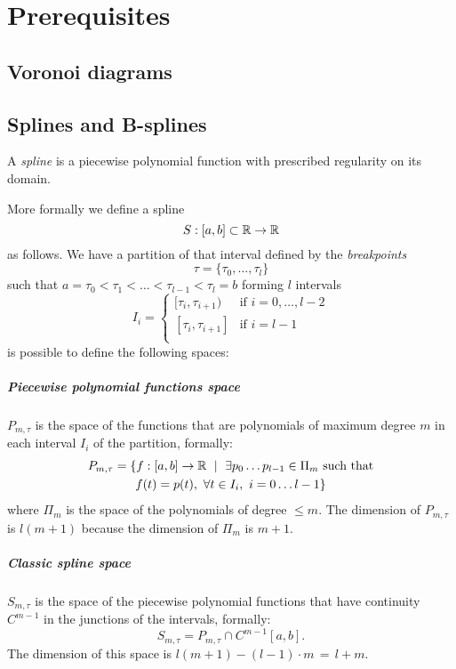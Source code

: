 \documentclass[dissertation.tex]{subfiles}
\begin{document}
\chapter{Prerequisites}
\section{Voronoi diagrams}\label{sec:voronoi}
\section{Splines and B-splines}\label{sec:spline}
A \emph{spline} is a piecewise polynomial function with prescribed
regularity on its domain.

More formally we define a spline
$$S:[a,b]\subset\mathbb{R}\rightarrow\mathbb{R}$$
as follows.
We have a partition of that interval defined by the \emph{breakpoints}
$$\tau = \{\tau_0,\dots,\tau_l\}$$
such that $a=\tau_0<\tau_1<\dots<\tau_{l-1}<\tau_l=b$ forming $l$
intervals
$$
I_i=
\begin{cases}
  [\tau_i,\tau_{i+1}) & \mbox{if } i=0,\dots,l-2\\
    [\tau_i,\tau_{i+1}] & \mbox{if } i=l-1\\
\end{cases}
$$
is possible to define the following spaces:
\paragraph{Piecewise polynomial functions space} $P_{m,\tau}$
is the space of the functions that are polynomials of maximum degree $m$
in each interval $I_i$ of the partition, formally:
\begin{multline*}
  P_{m,\tau}=\{f:[a,b]\rightarrow\mathbb{R}\ \mid\ \exists p_0\dots
  p_{l-1}\in\Pi_m \ \text{such that}\\
  f(t)=p(t),\ \forall t\in I_i,\
  i=0\dots l-1\}
\end{multline*}
where $\Pi_m$ is the space of the polynomials of degree $\le m$. The
dimension of $P_{m,\tau}$ is $l(m+1)$ because the dimension of $\Pi_m$
is $m+1$.
\paragraph{Classic spline space} $S_{m,\tau}$ is the space of
the piecewise polynomial functions that have continuity $C^{m-1}$ in
the junctions of the intervals, formally:
$$
S_{m,\tau}=P_{m,\tau}\cap C^{m-1}[a,b].
$$
The dimension of this space is $l(m+1)-(l-1)\cdot m\,=\,l+m$.
\end{document}
